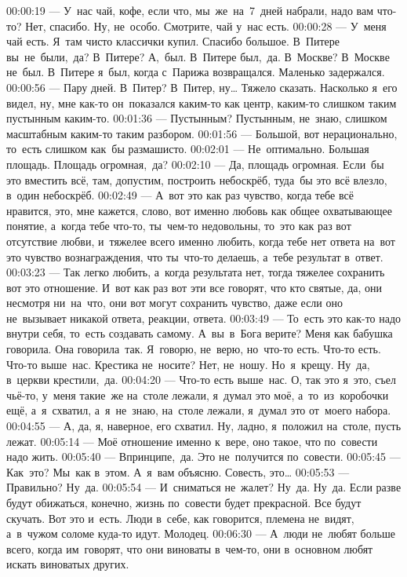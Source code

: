 00:00:19 — У нас чай, кофе, если что, мы же на 7 дней набрали, надо вам что-то? Нет, спасибо. Ну, не особо. Смотрите, чай у нас есть.
00:00:28 — У меня чай есть. Я там чисто классички купил. Спасибо большое. В Питере вы не были, да? В Питере? А, был. В Питере был, да. В Москве? В Москве не был. В Питере я был, когда с Парижа возвращался. Маленько задержался.
00:00:56 — Пару дней. В Питер? В Питер, ну… Тяжело сказать. Насколько я его видел, ну, мне как-то он показался каким-то как центр, каким-то слишком таким пустынным каким-то.
00:01:36 — Пустынным? Пустынным, не знаю, слишком масштабным каким-то таким разбором.
00:01:56 — Большой, вот нерационально, то есть слишком как бы размашисто.
00:02:01 — Не оптимально. Большая площадь. Площадь огромная, да?
00:02:10 — Да, площадь огромная. Если бы это вместить всё, там, допустим, построить небоскрёб, туда бы это всё влезло, в один небоскрёб.
00:02:49 — А вот это как раз чувство, когда тебе всё нравится, это, мне кажется, слово, вот именно любовь как общее охватывающее понятие, а когда тебе что-то, ты чем-то недовольны, то это как раз вот отсутствие любви, и тяжелее всего именно любить, когда тебе нет ответа на вот это чувство вознаграждения, что ты что-то делаешь, а тебе результат в ответ.
00:03:23 — Так легко любить, а когда результата нет, тогда тяжелее сохранить вот это отношение. И вот как раз вот эти все говорят, что кто святые, да, они несмотря ни на что, они вот могут сохранить чувство, даже если оно не вызывает никакой ответа, реакции, ответа.
00:03:49 — То есть это как-то надо внутри себя, то есть создавать самому. А вы в Бога верите? Меня как бабушка говорила. Она говорила так. Я говорю, не верю, но что-то есть. Что-то есть. Что-то выше нас. Крестика не носите? Нет, не ношу. Но я крещу. Ну да, в церкви крестили, да.
00:04:20 — Что-то есть выше нас. О, так это я это, съел чьё-то, у меня такие же на столе лежали, я думал это моё, а то из коробочки ещё, а я схватил, а я не знаю, на столе лежали, я думал это от моего набора.
00:04:55 — А, да, я, наверное, его схватил. Ну, ладно, я положил на столе, пусть лежат.
00:05:14 — Моё отношение именно к вере, оно такое, что по совести надо жить.
00:05:40 — Впринципе, да. Это не получится по совести.
00:05:45 — Как это? Мы как в этом. А я вам объясню. Совесть, это…
00:05:53 — Правильно? Ну да.
00:05:54 — И сниматься не жалет? Ну да. Ну да. Если разве будут обижаться, конечно, жизнь по совести будет прекрасной. Все будут скучать. Вот это и есть. Люди в себе, как говорится, племена не видят, а в чужом соломе куда-то идут. Молодец.
00:06:30 — А люди не любят больше всего, когда им говорят, что они виноваты в чем-то, они в основном любят искать виноватых других.
